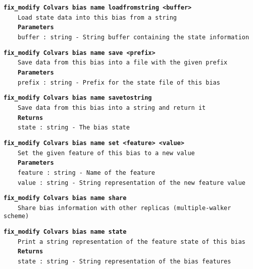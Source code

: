 \begin{mdexampleinput}{}
\texttt{\textbf{fix\_modify Colvars bias name loadfromstring <buffer>}}
\\
\-~~~~\texttt{Load state data into this bias from a string}
\\
\-~~~~\texttt{\textbf{Parameters}}
\\
\-~~~~\texttt{buffer : string - String buffer containing the state information}
\end{mdexampleinput}
\begin{mdexampleinput}{}
\texttt{\textbf{fix\_modify Colvars bias name save <prefix>}}
\\
\-~~~~\texttt{Save data from this bias into a file with the given prefix}
\\
\-~~~~\texttt{\textbf{Parameters}}
\\
\-~~~~\texttt{prefix : string - Prefix for the state file of this bias}
\end{mdexampleinput}
\begin{mdexampleinput}{}
\texttt{\textbf{fix\_modify Colvars bias name savetostring}}
\\
\-~~~~\texttt{Save data from this bias into a string and return it}
\\
\-~~~~\texttt{\textbf{Returns}}
\\
\-~~~~\texttt{state : string - The bias state}
\end{mdexampleinput}
\begin{mdexampleinput}{}
\texttt{\textbf{fix\_modify Colvars bias name set <feature> <value>}}
\\
\-~~~~\texttt{Set the given feature of this bias to a new value}
\\
\-~~~~\texttt{\textbf{Parameters}}
\\
\-~~~~\texttt{feature : string - Name of the feature}
\\
\-~~~~\texttt{value : string - String representation of the new feature value}
\end{mdexampleinput}
\begin{mdexampleinput}{}
\texttt{\textbf{fix\_modify Colvars bias name share}}
\\
\-~~~~\texttt{Share bias information with other replicas (multiple-walker scheme)}
\end{mdexampleinput}
\begin{mdexampleinput}{}
\texttt{\textbf{fix\_modify Colvars bias name state}}
\\
\-~~~~\texttt{Print a string representation of the feature state of this bias}
\\
\-~~~~\texttt{\textbf{Returns}}
\\
\-~~~~\texttt{state : string - String representation of the bias features}
\end{mdexampleinput}
